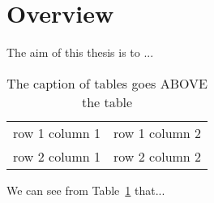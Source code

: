\section{Overview}
\label{sec::overview}
The aim of this thesis is to ...

\begin{table}[!htbp]
    \centering
    \caption{The caption of tables goes ABOVE the table}
    \begin{tabular}{c|c}
         row 1 column 1 & row 1 column 2  \\
         row 2 column 1 & row 2 column 2 
    \end{tabular}
    
    \label{tab::table_template}
\end{table}

We can see from Table~\ref{tab::table_template} that...